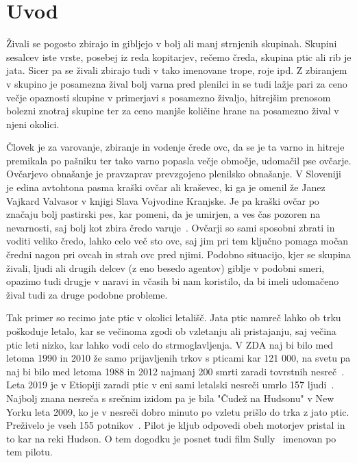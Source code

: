 \section{Uvod}

Živali se pogosto zbirajo in gibljejo v bolj ali manj strnjenih skupinah. Skupini sesalcev iste vrste, posebej iz reda kopitarjev, rečemo čreda, skupina ptic ali rib je jata. Sicer pa se živali zbirajo tudi v tako imenovane trope, roje ipd. Z zbiranjem v skupino je posamezna žival bolj varna pred plenilci in se tudi lažje pari za ceno večje opaznosti skupine v primerjavi s posamezno živaljo, hitrejšim prenosom bolezni znotraj skupine ter za ceno manjše količine hrane na posamezno žival v njeni okolici.

Človek je za varovanje, zbiranje in vodenje črede ovc, da se je ta varno in hitreje premikala po pašniku ter tako varno popasla večje območje, udomačil pse ovčarje. Ovčarjevo obnašanje je pravzaprav prevzgojeno plenilsko obnašanje. V Sloveniji je edina avtohtona pasma kraški ovčar ali kraševec, ki ga je omenil že Janez Vajkard Valvasor v knjigi Slava Vojvodine Kranjske. Je pa kraški ovčar po značaju bolj pastirski pes, kar pomeni, da je umirjen, a ves čas pozoren na nevarnosti, saj bolj kot zbira čredo varuje~\cite{krasevec}.
Ovčarji so sami sposobni zbrati in voditi veliko čredo, lahko celo več sto ovc, saj jim pri tem ključno pomaga močan čredni nagon pri ovcah in strah ovc pred njimi. Podobno situacijo, kjer se skupina živali, ljudi ali drugih delcev (z eno besedo agentov) giblje v podobni smeri, opazimo tudi drugje v naravi in včasih bi nam koristilo, da bi imeli udomačeno žival tudi za druge podobne probleme. 

Tak primer so recimo jate ptic v okolici letališč. Jata ptic namreč lahko ob trku poškoduje letalo, kar se večinoma zgodi ob vzletanju ali pristajanju, saj večina ptic leti nizko, kar lahko vodi celo do strmoglavljenja. V ZDA naj bi bilo med letoma 1990 in 2010 že samo prijavljenih trkov s pticami kar 121 000, na svetu pa naj bi bilo med letoma 1988 in 2012 najmanj 200 smrti zaradi tovrstnih nesreč~\cite{letalske-nesrece}. Leta 2019 je v Etiopiji zaradi ptic v eni sami letalski nesreči umrlo 157 ljudi~\cite{letalske-nesrece2}. Najbolj znana nesreča s srečnim izidom pa je bila "Čudež na Hudsonu" v New Yorku leta 2009, ko je v nesreči dobro minuto po vzletu prišlo do trka z jato ptic. Preživelo je vseh 155 potnikov~\cite{letalske-hudson}. Pilot je kljub odpovedi obeh motorjev pristal in to kar na reki Hudson. O tem dogodku je posnet tudi film Sully~\cite{letalske-sully} imenovan po tem pilotu.

